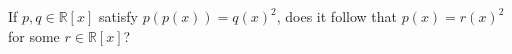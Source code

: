 If $p,q\in\mathbb{R}[x]$ satisfy $p(p(x))=q(x)^2$, does it follow that $p(x)=r(x)^2$ for some $r\in\mathbb{R}[x]$?